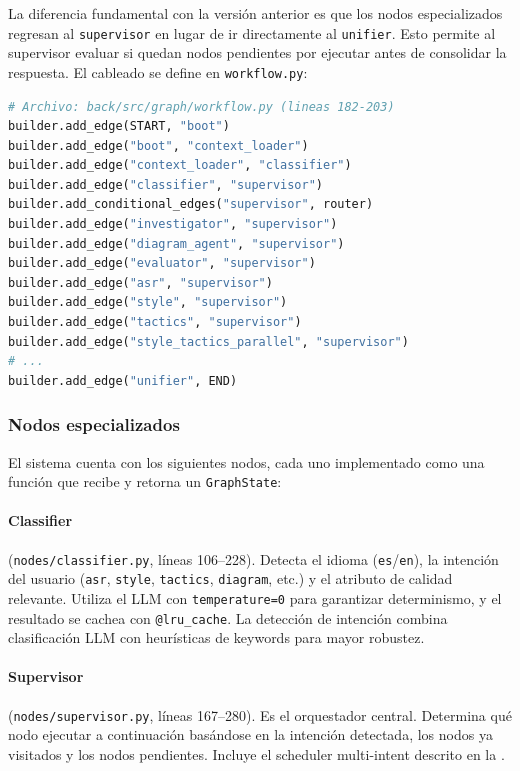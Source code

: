 \documentclass[12pt, letterpaper, oneside]{article}
\begin{document}
La diferencia fundamental con la versión anterior es que los nodos especializados
regresan al \texttt{supervisor} en lugar de ir directamente al \texttt{unifier}.
Esto permite al supervisor evaluar si quedan nodos pendientes por ejecutar antes
de consolidar la respuesta. El cableado se define en \texttt{workflow.py}:

\begin{lstlisting}[language=Python,
  caption={Cableado del grafo en \texttt{workflow.py} (extracto)},
  label={lst:workflow-wiring},
  firstnumber=182]
# Archivo: back/src/graph/workflow.py (lineas 182-203)
builder.add_edge(START, "boot")
builder.add_edge("boot", "context_loader")
builder.add_edge("context_loader", "classifier")
builder.add_edge("classifier", "supervisor")
builder.add_conditional_edges("supervisor", router)
builder.add_edge("investigator", "supervisor")
builder.add_edge("diagram_agent", "supervisor")
builder.add_edge("evaluator", "supervisor")
builder.add_edge("asr", "supervisor")
builder.add_edge("style", "supervisor")
builder.add_edge("tactics", "supervisor")
builder.add_edge("style_tactics_parallel", "supervisor")
# ...
builder.add_edge("unifier", END)
\end{lstlisting}

\subsubsection{Nodos especializados}
\label{sssec:nodos}

El sistema cuenta con los siguientes nodos, cada uno implementado como una función
que recibe y retorna un \texttt{GraphState}:

\paragraph{Classifier} (\texttt{nodes/classifier.py}, líneas 106--228).
Detecta el idioma (\texttt{es}/\texttt{en}), la intención del usuario
(\texttt{asr}, \texttt{style}, \texttt{tactics}, \texttt{diagram}, etc.) y el
atributo de calidad relevante. Utiliza el LLM con \texttt{temperature=0} para
garantizar determinismo, y el resultado se cachea con \texttt{@lru\_cache}. La
detección de intención combina clasificación LLM con heurísticas de keywords
para mayor robustez.

\paragraph{Supervisor} (\texttt{nodes/supervisor.py}, líneas 167--280).
Es el orquestador central. Determina qué nodo ejecutar a continuación basándose
en la intención detectada, los nodos ya visitados y los nodos pendientes. Incluye
el scheduler multi-intent descrito en la .
\end{document}
